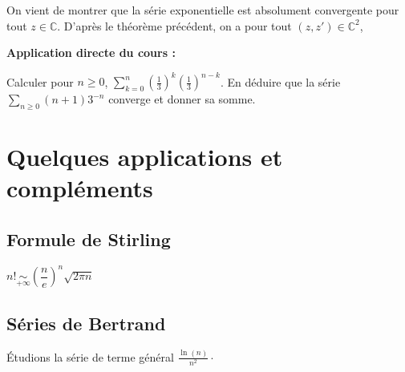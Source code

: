 \documentclass[french,11pt,twoside]{VcCours}
\newenvironment{ApplicationDirecte}{\textbf{Application directe du cours :}

}{}
\newcommand{\Sum}[2]{\ensuremath{\textstyle{\sum\limits_{#1}^{#2}}}}
\begin{document}
On vient de montrer que la série exponentielle est absolument convergente pour tout $z \in \mathbb{C}$. D'après le théorème précédent, on a pour tout $(z,z') \in \mathbb{C}^2$,


\vspace{7cm}

\begin{ApplicationDirecte}
Calculer pour $n \geq 0$, $\Sum{k=0}{n}  \left( \frac{1}{3} \right)^k \left( \frac{1}{3} \right)^{n-k}$. En déduire que la série $\Sum{n \geq 0}{}  (n+1)3^{-n}$ converge et donner sa somme.
\end{ApplicationDirecte}

\section{Quelques applications et compléments}
\subsection{Formule de Stirling}

\begin{Theoreme}{}
\begin{center}
$n! \underset{ + \infty}{\sim} \left( \dfrac{n}{e}\right)^n \sqrt{2 \pi n}$
\end{center}
\end{Theoreme}
\subsection{Séries de Bertrand}
\begin{Exemple} Étudions la série de terme général $\frac{\ln(n)}{n^2}\cdot$

\vspace{3cm}
\end{Exemple}
\end{document}
